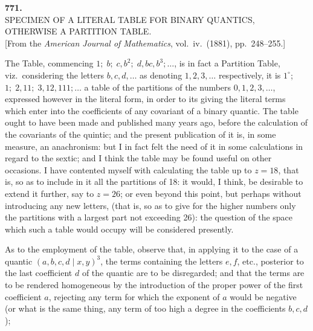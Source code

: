 \documentclass[11pt,a4paper]{article}
\begin{document}
\newpage
\begin{center}
\textbf{771.}\\[4pt]
\textsc{SPECIMEN OF A LITERAL TABLE FOR BINARY QUANTICS,\\
OTHERWISE A PARTITION TABLE.}\\[4pt]
[From the \textit{American Journal of Mathematics}, vol.\ iv.\ (1881), pp.\ 248--255.]
\end{center}

\bigskip

\noindent
The Table, commencing $1;\;b;\;c,b^{2};\;d,bc,b^{3};\ldots$, is in fact a Partition Table, viz.\ considering the letters $b,c,d,\ldots$ as denoting $1,2,3,\ldots$ respectively, it is $1^{\circ}$; $1;\;2,11;\;3,12,111;\ldots$ a table of the partitions of the numbers $0,1,2,3,\ldots$, expressed however in the literal form, in order to its giving the literal terms which enter into the coefficients of any covariant of a binary quantic. The table ought to have been made and published many years ago, before the calculation of the covariants of the quintic; and the present publication of it is, in some measure, an anachronism: but I in fact felt the need of it in some calculations in regard to the sextic; and I think the table may be found useful on other occasions. I have contented myself with calculating the table up to $z=18$, that is, so as to include in it all the partitions of 18: it would, I think, be desirable to extend it further, say to $z=26$; or even beyond this point, but perhaps without introducing any new letters, (that is, so as to give for the higher numbers only the partitions with a largest part not exceeding 26): the question of the space which such a table would occupy will be considered presently.

As to the employment of the table, observe that, in applying it to the case of a quantic $(a,b,c,d\mid x,y)^{3}$, the terms containing the letters $e,f$, etc., posterior to the last coefficient $d$ of the quantic are to be disregarded; and that the terms are to be rendered homogeneous by the introduction of the proper power of the first coefficient $a$, rejecting any term for which the exponent of $a$ would be negative (or what is the same thing, any term of too high a degree in the coefficients $b,c,d$);
\end{document}
